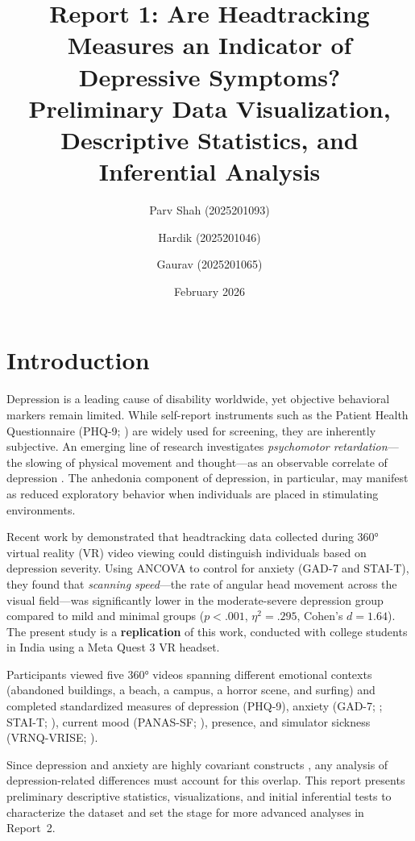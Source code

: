 \documentclass[12pt]{article}
\title{\textbf{Report 1: Are Headtracking Measures an Indicator of Depressive Symptoms?}\\[0.5em]
\large Preliminary Data Visualization, Descriptive Statistics, and Inferential Analysis}
\author{Parv Shah (2025201093) \and Hardik (2025201046) \and Gaurav (2025201065)}
\date{February 2026}
\begin{document}
\maketitle

\section{Introduction}

Depression is a leading cause of disability worldwide, yet objective behavioral markers remain limited. While self-report instruments such as the Patient Health Questionnaire (PHQ-9; \citealt{kroenke2001phq9}) are widely used for screening, they are inherently subjective. An emerging line of research investigates \textit{psychomotor retardation}---the slowing of physical movement and thought---as an observable correlate of depression \citep{bennabi2013psychomotor}. The anhedonia component of depression, in particular, may manifest as reduced exploratory behavior when individuals are placed in stimulating environments.

Recent work by \citet{srivastava2025headscan} demonstrated that headtracking data collected during 360° virtual reality (VR) video viewing could distinguish individuals based on depression severity. Using ANCOVA to control for anxiety (GAD-7 and STAI-T), they found that \textit{scanning speed}---the rate of angular head movement across the visual field---was significantly lower in the moderate-severe depression group compared to mild and minimal groups ($p < .001$, $\eta^2 = .295$, Cohen's $d = 1.64$). The present study is a \textbf{replication} of this work, conducted with college students in India using a Meta Quest 3 VR headset.

Participants viewed five 360° videos spanning different emotional contexts (abandoned buildings, a beach, a campus, a horror scene, and surfing) and completed standardized measures of depression (PHQ-9), anxiety (GAD-7; \citealt{spitzer2006gad7}; STAI-T; \citealt{spielberger1983stai}), current mood (PANAS-SF; \citealt{watson1988panas}), presence, and simulator sickness (VRNQ-VRISE; \citealt{kourtesis2019vrnq}).

Since depression and anxiety are highly covariant constructs \citep{kalin2020anxiety}, any analysis of depression-related differences must account for this overlap. This report presents preliminary descriptive statistics, visualizations, and initial inferential tests to characterize the dataset and set the stage for more advanced analyses in Report~2.
\end{document}
